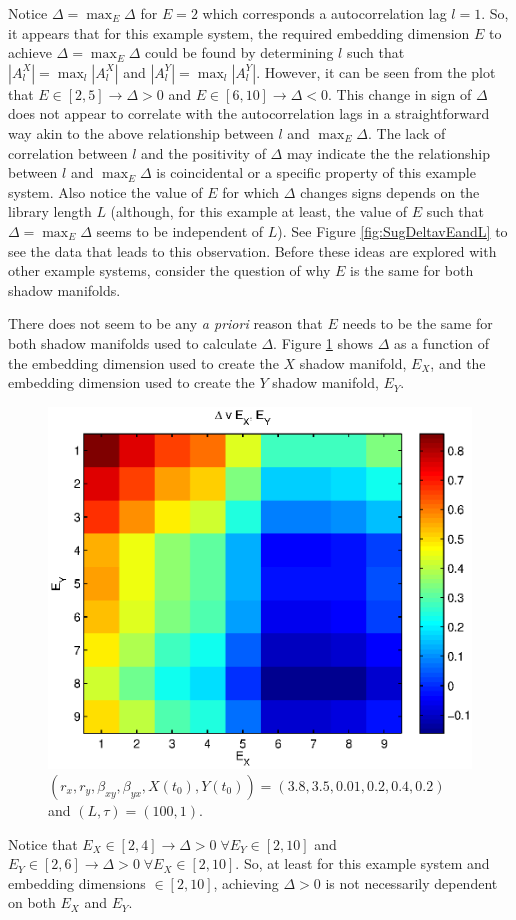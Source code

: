 \documentclass[a4paper,11pt]{article}
\begin{document}
Notice $\Delta = \max_E \Delta$ for $E=2$ which corresponds a autocorrelation lag $l=1$.  So, it appears that for this example system, the required embedding dimension $E$ to achieve $\Delta=\max_E \Delta$ could be found by determining $l$ such that $|A_l^X|=\max_l |A_l^X|$ and $|A_l^Y|=\max_l |A_l^Y|$.  However, it can be seen from the plot that $E\in [2,5]\rightarrow \Delta>0$ and $E\in [6,10]\rightarrow \Delta<0$.  This change in sign of $\Delta$ does not appear to correlate with the autocorrelation lags in a straightforward way akin to the above relationship between $l$ and $\max_E \Delta$.  The lack of correlation between $l$ and the positivity of $\Delta$ may indicate the the relationship between $l$ and $\max_E \Delta$ is coincidental or a specific property of this example system.  Also notice the value of $E$ for which $\Delta$ changes signs depends on the library length $L$ (although, for this example at least, the value of $E$ such that $\Delta = \max_E \Delta$ seems to be independent of $L$).  See Figure \ref{fig:SugDeltavEandL} to see the data that leads to this observation.  Before these ideas are explored with other example systems, consider the question of why $E$ is the same for both shadow manifolds.

There does not seem to be any {\em a priori} reason that $E$ needs to be the same for both shadow manifolds used to calculate $\Delta$.  Figure \ref{fig:SugExVaryE} shows $\Delta$ as a function of the embedding dimension used to create the $X$ shadow manifold, $E_X$, and the embedding dimension used to create the $Y$ shadow manifold, $E_Y$.  
\begin{figure}[h!t]
\centering
\label{fig:SugExVaryE}
\includegraphics[scale=0.55]{SugExVaryE.eps}
\caption{$\left(r_x,r_y,\beta_{xy},\beta_{yx},X(t_0),Y(t_0)\right) = \left(3.8,3.5,0.01,0.2,0.4,0.2\right)$ and $\left(L,\tau\right) = \left(100,1\right)$.}
\end{figure}
Notice that $E_X \in [2,4]\rightarrow \Delta>0\;\forall E_Y\in[2,10]$ and $E_Y \in[2,6]\rightarrow \Delta>0\;\forall E_X\in[2,10]$.  So, at least for this example system and embedding dimensions $\in[2,10]$, achieving $\Delta>0$ is not necessarily dependent on both $E_X$ and $E_Y$.  
\end{document}

